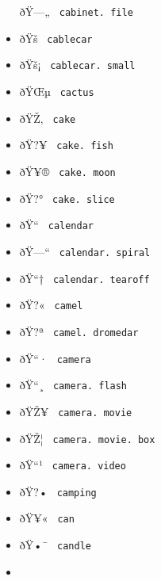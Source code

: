 \begin{itemize}
  \label{symbol-cabinet.file}{{ ðŸ---„ }
  \texttt{\ cabinet.\ file\ }}
\item
  \label{symbol-cablecar}{{ ðŸš } \texttt{\ cablecar\ }}
\item
  \label{symbol-cablecar.small}{{ ðŸš¡ }
  \texttt{\ cablecar.\ small\ }}
\item
  \label{symbol-cactus}{{ ðŸŒµ } \texttt{\ cactus\ }}
\item
  \label{symbol-cake}{{ ðŸŽ‚ } \texttt{\ cake\ }}
\item
  \label{symbol-cake.fish}{{ ðŸ?¥ }
  \texttt{\ cake.\ fish\ }}
\item
  \label{symbol-cake.moon}{{ ðŸ¥® }
  \texttt{\ cake.\ moon\ }}
\item
  \label{symbol-cake.slice}{{ ðŸ?° }
  \texttt{\ cake.\ slice\ }}
\item
  \label{symbol-calendar}{{ ðŸ`` } \texttt{\ calendar\ }}
\item
  \label{symbol-calendar.spiral}{{ ðŸ---`` }
  \texttt{\ calendar.\ spiral\ }}
\item
  \label{symbol-calendar.tearoff}{{ ðŸ``† }
  \texttt{\ calendar.\ tearoff\ }}
\item
  \label{symbol-camel}{{ ðŸ?« } \texttt{\ camel\ }}
\item
  \label{symbol-camel.dromedar}{{ ðŸ?ª }
  \texttt{\ camel.\ dromedar\ }}
\item
  \label{symbol-camera}{{ ðŸ``· } \texttt{\ camera\ }}
\item
  \label{symbol-camera.flash}{{ ðŸ``¸ }
  \texttt{\ camera.\ flash\ }}
\item
  \label{symbol-camera.movie}{{ ðŸŽ¥ }
  \texttt{\ camera.\ movie\ }}
\item
  \label{symbol-camera.movie.box}{{ ðŸŽ¦ }
  \texttt{\ camera.\ movie.\ box\ }}
\item
  \label{symbol-camera.video}{{ ðŸ``¹ }
  \texttt{\ camera.\ video\ }}
\item
  \label{symbol-camping}{{ ðŸ?• } \texttt{\ camping\ }}
\item
  \label{symbol-can}{{ ðŸ¥« } \texttt{\ can\ }}
\item
  \label{symbol-candle}{{ ðŸ•¯ } \texttt{\ candle\ }}
\item

\end{itemize}
